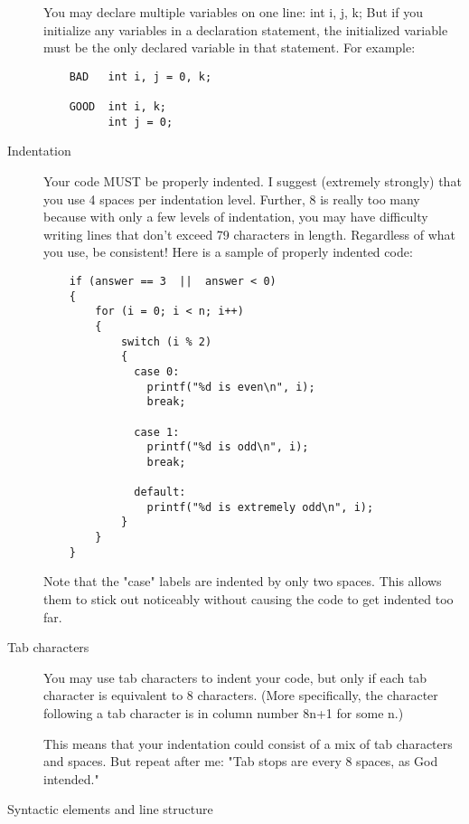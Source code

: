 \begin{description}
    You may declare multiple variables on one line:
    int i, j, k;
    But if you initialize any variables in a declaration statement,
    the initialized variable must be the only declared variable in
    that statement.  For example:
\begin{verbatim}    
    BAD   int i, j = 0, k;

    GOOD  int i, k;
          int j = 0;

\end{verbatim}
\clearpage
\item[Indentation] \hfill

    Your code MUST be properly indented.  I suggest (extremely strongly)
    that you use 4 spaces per indentation level.  Further, 8 is really
    too many because with only a few levels of indentation, you may
    have difficulty writing lines that don't exceed 79 characters in
    length.  Regardless of what you use, be consistent!  Here is a
    sample of properly indented code:
\begin{verbatim}
    if (answer == 3  ||  answer < 0)
    {
        for (i = 0; i < n; i++)
        {
            switch (i % 2)
            {
              case 0:
                printf("%d is even\n", i);
                break;
                
              case 1:
                printf("%d is odd\n", i);
                break;
                
              default:
                printf("%d is extremely odd\n", i);
            }
        }
    }
\end{verbatim}
    Note that the "case" labels are indented by only two spaces.
    This allows them to stick out noticeably without causing the
    code to get indented too far.

\clearpage
\item[Tab characters] \hfill

    You may use tab characters to indent your code, but only if each
    tab character is equivalent to 8 characters.  (More specifically,
    the character following a tab character is in column number 8n+1
    for some n.)

    This means that your indentation could consist of a mix of tab
    characters and spaces.  But repeat after me: "Tab stops are every
    8 spaces, as God intended."


\item[Syntactic elements and line structure] \hfill


\end{description}
